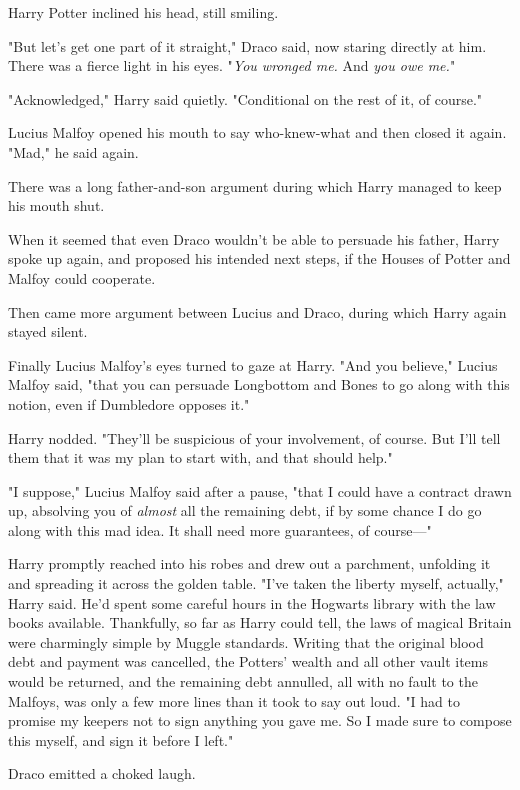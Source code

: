Harry Potter inclined his head, still smiling.

"But let's get one part of it straight," Draco said, now staring directly at
him. There was a fierce light in his eyes. "\emph{You wronged me.} And
\emph{you owe me.}"

"Acknowledged," Harry said quietly. "Conditional on the rest of it, of course."

Lucius Malfoy opened his mouth to say who-knew-what and then closed it again.
"Mad," he said again.

There was a long father-and-son argument during which Harry managed to keep his
mouth shut.

When it seemed that even Draco wouldn't be able to persuade his father, Harry
spoke up again, and proposed his intended next steps, if the Houses of Potter
and Malfoy could cooperate.

Then came more argument between Lucius and Draco, during which Harry again
stayed silent.

Finally Lucius Malfoy's eyes turned to gaze at Harry. "And you believe," Lucius
Malfoy said, "that you can persuade Longbottom and Bones to go along with this
notion, even if Dumbledore opposes it."

Harry nodded. "They'll be suspicious of your involvement, of course. But I'll
tell them that it was my plan to start with, and that should help."

"I suppose," Lucius Malfoy said after a pause, "that I could have a contract
drawn up, absolving you of \emph{almost} all the remaining debt, if by some
chance I do go along with this mad idea. It shall need more guarantees, of
course---"

Harry promptly reached into his robes and drew out a parchment, unfolding it
and spreading it across the golden table. "I've taken the liberty myself,
actually," Harry said. He'd spent some careful hours in the Hogwarts library
with the law books available. Thankfully, so far as Harry could tell, the laws
of magical Britain were charmingly simple by Muggle standards. Writing that the
original blood debt and payment was cancelled, the Potters' wealth and all
other vault items would be returned, and the remaining debt annulled, all with
no fault to the Malfoys, was only a few more lines than it took to say out
loud. "I had to promise my keepers not to sign anything you gave me. So I made
sure to compose this myself, and sign it before I left."

Draco emitted a choked laugh.

